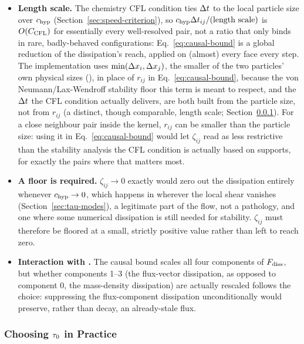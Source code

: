 \begin{itemize}
\item \textbf{Length scale.} The chemistry CFL condition ties $\Delta t$ to the
  local particle size over $c_{\rm hyp}$ (Section~\ref{sec:speed-criterion}), so
  $c_{\rm hyp}\Delta t_{ij}/(\text{length scale})$ is $O(C_{\mathrm{CFL}})$ for essentially every
  well-resolved pair, not a ratio that only binds in rare, badly-behaved
  configurations: Eq.~\eqref{eq:causal-bound} is a global reduction of the
  dissipation's reach, applied on (almost) every face every step. The
  implementation uses $\min(\Delta x_i,\Delta x_j)$, the smaller of the two
  particles' own physical sizes
  (), in place of $r_{ij}$
  in Eq.~\eqref{eq:causal-bound}, because the von Neumann/Lax-Wendroff
  stability floor this term is meant to respect, and the $\Delta t$ the CFL
  condition actually delivers, are both built from the particle size, not
  from $r_{ij}$ (a distinct, though comparable, length scale;
  Section~\ref{sec:practical-tau0}). For a close neighbour pair inside the
  kernel, $r_{ij}$ can be smaller than the particle size: using it in
  Eq.~\eqref{eq:causal-bound} would let $\zeta_{ij}$ read as less
  restrictive than the stability analysis the CFL condition is actually
  based on supports, for exactly the pairs where that matters most.
\item \textbf{A floor is required.} $\zeta_{ij}\to0$ exactly would zero
  out the dissipation entirely whenever $c_{\rm hyp}\to0$, which happens in
   wherever the local shear vanishes
  (Section~\ref{sec:tau-modes}), a legitimate part of the flow, not
  a pathology, and one where some numerical dissipation is still needed
  for stability. $\zeta_{ij}$ must therefore be floored at a small,
  strictly positive value rather than left to reach zero.
\item \textbf{Interaction with .} The
  causal bound scales all four components of $F_{\rm diss}$, but whether
  components 1--3 (the flux-vector dissipation, as opposed to component 0,
  the mass-density dissipation) are actually rescaled follows the
   choice: suppressing the
  flux-component dissipation unconditionally would preserve, rather than
  decay, an already-stale flux.
\end{itemize}

\subsubsection{Choosing $\tau_0$ in Practice}
\label{sec:practical-tau0}

